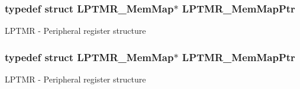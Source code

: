 \subsubsection[{\texorpdfstring{L\+P\+T\+M\+R\+\_\+\+Mem\+Map\+Ptr}{LPTMR_MemMapPtr}}]{\setlength{\rightskip}{0pt plus 5cm}typedef struct {\bf L\+P\+T\+M\+R\+\_\+\+Mem\+Map}$\ast$ {\bf L\+P\+T\+M\+R\+\_\+\+Mem\+Map\+Ptr}}\hypertarget{group___l_p_t_m_r___peripheral_ga765226e2eeb35160c12820d4a2541320}{}\label{group___l_p_t_m_r___peripheral_ga765226e2eeb35160c12820d4a2541320}
L\+P\+T\+MR -\/ Peripheral register structure 
\subsubsection[{\texorpdfstring{L\+P\+T\+M\+R\+\_\+\+Mem\+Map\+Ptr}{LPTMR_MemMapPtr}}]{\setlength{\rightskip}{0pt plus 5cm}typedef struct {\bf L\+P\+T\+M\+R\+\_\+\+Mem\+Map}$\ast$ {\bf L\+P\+T\+M\+R\+\_\+\+Mem\+Map\+Ptr}}\hypertarget{group___l_p_t_m_r___peripheral_ga765226e2eeb35160c12820d4a2541320}{}\label{group___l_p_t_m_r___peripheral_ga765226e2eeb35160c12820d4a2541320}
L\+P\+T\+MR -\/ Peripheral register structure 